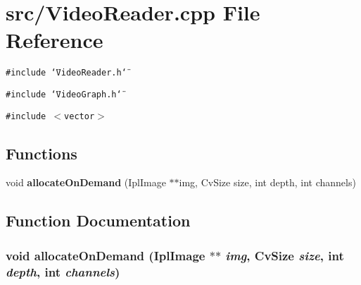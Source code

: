 \section{src/VideoReader.cpp File Reference}
\label{VideoReader_8cpp}
{\tt \#include \char`\"{}VideoReader.h\char`\"{}}\par
{\tt \#include \char`\"{}VideoGraph.h\char`\"{}}\par
{\tt \#include $<$vector$>$}\par
\subsection*{Functions}
\begin{CompactItemize}
\item 
void {\bf allocateOnDemand} (IplImage $\ast$$\ast$img, CvSize size, int depth, int channels)
\end{CompactItemize}


\subsection{Function Documentation}
\subsubsection{\setlength{\rightskip}{0pt plus 5cm}void allocateOnDemand (IplImage $\ast$$\ast$ {\em img}, CvSize {\em size}, int {\em depth}, int {\em channels})}\label{VideoReader_8cpp_66fc830815e9f0a92413aac31cca7c6e}


